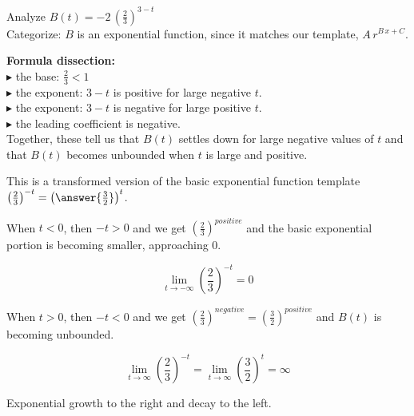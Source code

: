 \documentclass{ximera}
\begin{document}
\begin{example}  



Analyze   $B(t) = -2 \, \left( \frac{2}{3} \right)^{3-t}$ \\



Categorize: $B$ is an exponential function, since it matches our template, $A \, r^{B \, x + C} $. \\


\begin{idea}


\textbf{\textcolor{purple!85!blue}{Formula dissection:}}  \\


$\blacktriangleright$  the base: $\frac{2}{3} < 1$   \\
$\blacktriangleright$  the exponent: $3-t$ is positive for large negative $t$. \\
$\blacktriangleright$  the exponent: $3-t$ is negative for large positive $t$. \\
$\blacktriangleright$  the leading coefficient is negative. \\


Together, these tell us that $B(t)$ settles down for large negative values of $t$ and that $B(t)$ becomes unbounded when $t$ is large and positive.



This is a transformed version of the basic exponential function template $\left( \frac{2}{3} \right)^{-t} = \left( \answer{\frac{3}{2}} \right)^t$.  



When $t < 0$, then $-t > 0$ and we get  $\left( \frac{2}{3} \right)^{positive}$ and the basic exponential portion is becoming smaller, approaching $0$.  





\[ \lim\limits_{t \to -\infty} \left( \frac{2}{3} \right)^{-t}  = 0 \]



When $t > 0$, then $-t < 0$ and we get  $\left( \frac{2}{3} \right)^{negative} = \left( \frac{3}{2} \right)^{positive}$ and $B(t)$ is becoming unbounded.  



\[ \lim\limits_{t \to \infty} \left( \frac{2}{3} \right)^{-t}  = \lim\limits_{t \to \infty} \left( \frac{3}{2} \right)^t  = \infty \]




Exponential growth to the right and decay to the left.







\end{idea}
\end{example}
\end{document}
